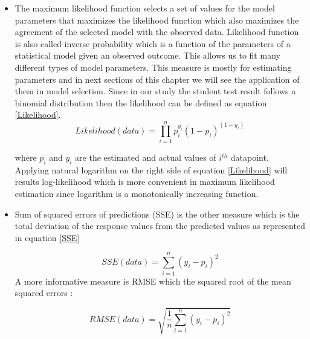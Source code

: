 \begin{itemize}

\item The maximum likelihood function selects a set of values for the model parameters that maximizes the likelihood function which also maximizes the agreement of the selected model with the observed data. Likelihood function is also called inverse probability which is a function of the parameters of a statistical model given an observed outcome. This allows us to fit many different types of model parameters. This measure is mostly for estimating parameters and in next sections of this chapter we will see the application of them in model selection. Since in our study the student test result follows a binomial distribution then the likelihood can be defined as equation \ref{Likelihood}.
\begin{equation}
Likelihood(data) = \prod_{i=1}^{n} p_i^{y_i}(1-p_i)^{(1-y_i)}
\label{Likelihood}
\end{equation}

where $p_i$ and $y_i$ are the estimated and actual values of $i^{th}$ datapoint. Applying natural logarithm on the right side of equation \ref{Likelihood} will results log-likelihood which is more convenient in maximum likelihood estimation since logarithm is a monotonically increasing function.

\item Sum of squared errors of predictions (SSE) is the other measure which is the total deviation of the response values from the predicted values as represented in equation \ref{SSE}

\begin{equation}
SSE(data) = \sum_{i=1}^{n} (y_i - p_i)^2
\label{SSE}
\end{equation}
A more informative measure is RMSE which the squared root of the mean squared errors  :

\begin{equation}
 RMSE(data) = \sqrt{\frac{1}{n}\sum_{i = 1}^{n}(y_i - p_i)^2}
\end{equation}


\end{itemize}
